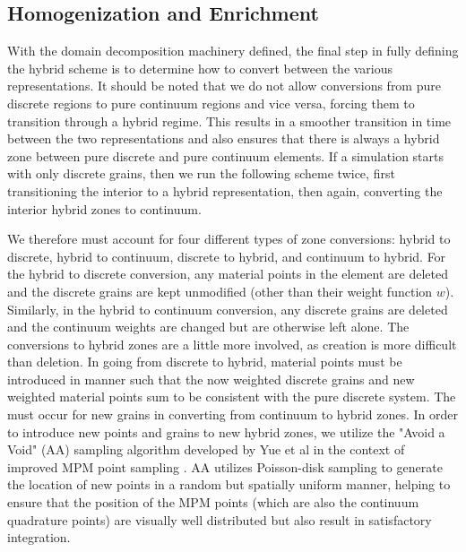 \subsection{Homogenization and Enrichment}
\label{sec:enrichment}
With the domain decomposition machinery defined, the final step in fully defining the hybrid scheme is to determine how to convert between the various representations. It should be noted that we do not allow conversions from pure discrete regions to pure continuum regions and vice versa, forcing them to transition through a hybrid regime. This results in a smoother transition in time between the two representations and also ensures that there is always a hybrid zone between pure discrete and pure continuum elements. If a simulation starts with only discrete grains, then we run the following scheme twice, first transitioning the interior to a hybrid representation, then again, converting the interior hybrid zones to continuum.

We therefore must account for four different types of zone conversions: hybrid to discrete, hybrid to continuum, discrete to hybrid, and continuum to hybrid. For the hybrid to discrete conversion, any material points in the element are deleted and the discrete grains are kept unmodified (other than their weight function $w$). Similarly, in the hybrid to continuum conversion, any discrete grains are deleted and the continuum weights are changed but are otherwise left alone. The conversions to hybrid zones are a little more involved, as creation is more difficult than deletion. In going from discrete to hybrid, material points must be introduced in manner such that the now weighted discrete grains and new weighted material points sum to be consistent with the pure discrete system. The must occur for new grains in converting from continuum to hybrid zones. In order to introduce new points and grains to new hybrid zones, we utilize the "Avoid a Void" (AA) sampling algorithm developed by Yue et al in the context of improved MPM point sampling \cite{Yue:2015:Continuum}. AA utilizes Poisson-disk sampling to generate the location of new points in a random but spatially uniform manner, helping to ensure that the position of the MPM points (which are also the continuum quadrature points) are visually well distributed but also result in satisfactory integration.

